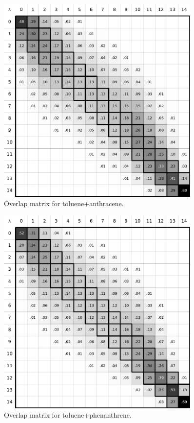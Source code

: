 \documentclass[
	12pt,				%
	openany,			%
	oneside,			%
	a4paper,			%
	english,			%
	brazil				%
	]{abntex2}
\begin{document}
\begin{apendicesenv}
\begin{figure}[H]
	\centering
	\includegraphics[width=0.9\textwidth]{Figures/otol_antr}
	\caption{Overlap matrix for toluene+anthracene.}
\end{figure}

\begin{figure}[H]
	\centering
	\includegraphics[width=0.9\textwidth]{Figures/otol_phen}
	\caption{Overlap matrix for toluene+phenanthrene.}
\end{figure}


\end{apendicesenv}
\end{document}
